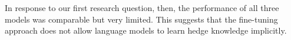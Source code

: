 \documentclass[11pt]{article}
\newcommand{\oneS}{\ensuremath{{}^{\textstyle *}}}
\begin{document}
In response to our first research question, then, the performance of all three models was comparable but very limited. This suggests that the fine-tuning approach does not allow language models to learn hedge knowledge implicitly.

\end{document}
